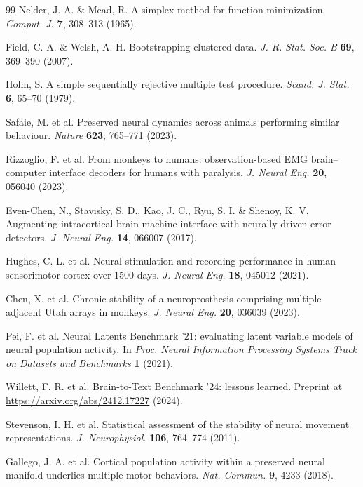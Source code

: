 \begin{thebibliography}{99}
 Nelder, J. A. \& Mead, R. A simplex method for function minimization. \textit{Comput. J.} \textbf{7}, 308--313 (1965).

 Field, C. A. \& Welsh, A. H. Bootstrapping clustered data. \textit{J. R. Stat. Soc. B} \textbf{69}, 369--390 (2007).

 Holm, S. A simple sequentially rejective multiple test procedure. \textit{Scand. J. Stat.} \textbf{6}, 65--70 (1979).

 Safaie, M. et al. Preserved neural dynamics across animals performing similar behaviour. \textit{Nature} \textbf{623}, 765--771 (2023).

 Rizzoglio, F. et al. From monkeys to humans: observation-based EMG brain--computer interface decoders for humans with paralysis. \textit{J. Neural Eng.} \textbf{20}, 056040 (2023).

 Even-Chen, N., Stavisky, S. D., Kao, J. C., Ryu, S. I. \& Shenoy, K. V. Augmenting intracortical brain-machine interface with neurally driven error detectors. \textit{J. Neural Eng.} \textbf{14}, 066007 (2017).

 Hughes, C. L. et al. Neural stimulation and recording performance in human sensorimotor cortex over 1500 days. \textit{J. Neural Eng.} \textbf{18}, 045012 (2021).

 Chen, X. et al. Chronic stability of a neuroprosthesis comprising multiple adjacent Utah arrays in monkeys. \textit{J. Neural Eng.} \textbf{20}, 036039 (2023).

 Pei, F. et al. Neural Latents Benchmark '21: evaluating latent variable models of neural population activity. In \textit{Proc. Neural Information Processing Systems Track on Datasets and Benchmarks} \textbf{1} (2021).

 Willett, F. R. et al. Brain-to-Text Benchmark '24: lessons learned. Preprint at \url{https://arxiv.org/abs/2412.17227} (2024).

 Stevenson, I. H. et al. Statistical assessment of the stability of neural movement representations. \textit{J. Neurophysiol.} \textbf{106}, 764--774 (2011).

 Gallego, J. A. et al. Cortical population activity within a preserved neural manifold underlies multiple motor behaviors. \textit{Nat. Commun.} \textbf{9}, 4233 (2018).


\end{thebibliography}
